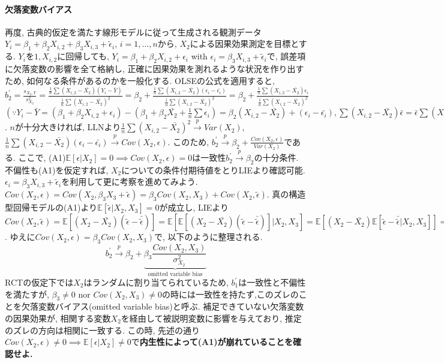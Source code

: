 \documentclass[paper=a4paper,fontsize=10pt]{jlreq}
\begin{document}
\paragraph{欠落変数バイアス}
再度, 古典的仮定を満たす線形モデルに従って生成される観測データ$Y_i=\beta_1+\beta_2X_{i,2}+\beta_3X_{i,3}+\tilde{\epsilon}_i$, $i=1,\dots,n$から, $X_2$による因果効果測定を目標とする. $Y_i$を$1, X_{i,2}$に回帰しても, $Y_i=\beta_1+\beta_2X_{i,2}+\epsilon_i$ with $\epsilon_i=\beta_3X_{i,3}+\tilde{\epsilon}_i$で, 誤差項に欠落変数の影響を全て格納し, 正確に因果効果を測れるような状況を作り出すため, 如何なる条件があるのかを一般化する. OLSEの公式を適用すると, $b_2^\prime =\frac{s_{X_2,Y}}{s_{X_2}^2}=\frac{\frac{1}{n}\sum{(X_{i,2}-\bar{X_{2}})(Y_{i}-\bar{Y})}}{\frac{1}{n}\sum{(X_{i,2}-\bar{X_{2}})^2}}=\beta_2+\frac{\frac{1}{n}\sum{(X_{i,2}-\bar{X_{2}})(\epsilon_i-\bar{\epsilon_i})}}{\frac{1}{n}\sum{(X_{i,2}-\bar{X_{2}})^2}}=\beta_2+\frac{\frac{1}{n}\sum{(X_{i,2}-\bar{X_{2}})\epsilon_i}}{\frac{1}{n}\sum{(X_{i,2}-\bar{X_{2}})^2}}$ $(\because Y_{i}-\bar{Y}=(\beta_1+\beta_2X_{i,2}+\epsilon_i)-(\beta_1+{\beta_2}\bar{X_{2}}+\frac{1}{n}\sum{\epsilon_i})={\beta_2}(X_{i,2}-\bar{X_{2}})+(\epsilon_i-\bar{\epsilon_i}), \sum{(X_{i,2}-\bar{X_{2}})\bar{\epsilon}}=\bar{\epsilon}\sum{(X_{i,2}-\bar{X_{2}})}=0)$. $n$が十分大きければ, LLNより$\frac{1}{n}\sum{(X_{i,2}-\bar{X_{2}})^2} \overset{p}{\to} Var(X_2)$, $\frac{1}{n}\sum{(X_{i,2}-\bar{X_{2}})(\epsilon_i-\bar{\epsilon_i})} \overset{p}{\to} Cov(X_2, \epsilon)$. このため, $b_2^\prime \overset{p}{\to} \beta_2+\frac{Cov(X_2, \epsilon)}{Var(X_2)}$である. ここで, (A1)$\mathbb{E}[\epsilon | X_{2}]=0 \implies Cov(X_2, \epsilon) = 0$は一致性$b_2^\prime \overset{p}{\to} \beta_2$の十分条件. 不偏性も(A1)を仮定すれば, $X_{2}$についての条件付期待値をとりLIEより確認可能. $\epsilon_i=\beta_3X_{i,3}+\tilde{\epsilon}_i$を利用して更に考察を進めてみよう. $Cov(X_2, \epsilon)=Cov(X_2, \beta_3X_{3}+\tilde{\epsilon})=\beta_3Cov(X_2, X_{3})+Cov(X_2, \tilde{\epsilon})$. 真の構造型回帰モデルの(A1)より$\mathbb{E}[\tilde{\epsilon} | X_{2}, X_{3}]=0$が成立し, LIEより$Cov(X_2, \tilde{\epsilon})=\mathbb{E}[(X_2-\bar{X_2})(\tilde{\epsilon}-\bar{\tilde{\epsilon}})]=\mathbb{E}[\mathbb{E}[(X_2-\bar{X_2})(\tilde{\epsilon}-\bar{\tilde{\epsilon}})]|X_{2}, X_{3}]=\mathbb{E}[(X_2-\bar{X_2})\mathbb{E}[\tilde{\epsilon}-\bar{\tilde{\epsilon}}|X_{2}, X_{3}]]=0$. ゆえに$Cov(X_2, \epsilon)=\beta_3Cov(X_2, X_{3})$で, 以下のように整理される.
\begin{equation*}
  b_2^\prime \overset{p}{\to} \beta_2+ \underset{\text{omitted variable bias}}{\underbrace{\beta_3\frac{Cov(X_2, X_3)}{\sigma_{X_2}^2}}}
\end{equation*}
RCTの仮定下では$X_2$はランダムに割り当てられているため, $b_1^\prime$は一致性と不偏性を満たすが, $\beta_3 \neq 0 \text{ nor } Cov(X_2, X_{3})\neq 0$の時には一致性を持たず,このズレのことを欠落変数バイアス(omitted variable bias)と呼ぶ. 補足できていない欠落変数の因果効果が, 相関する変数$X_2$を経由して被説明変数に影響を与えており, 推定のズレの方向は相関に一致する. この時, 先述の通り$ Cov(X_2, \epsilon) \neq 0 \implies \mathbb{E}[\epsilon | X_{2}] \neq 0$で\rmfamily\mcfamily\bfseries{内生性}\mdseries によって(A1)が崩れていることを確認せよ.\\
\end{document}
